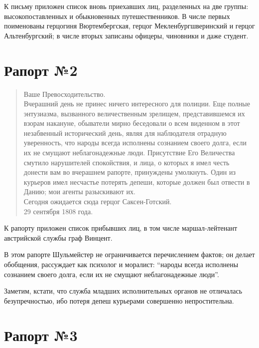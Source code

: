 \documentclass[
  oneside,
  12pt,
  titlepage]{book}
\begin{document}
К письму приложен список вновь приехавших лиц, разделенных на две группы: высокопоставленных и обыкновенных путешественников. В числе первых поименованы герцогиня Вюртембергская, герцог Мекленбургшверинский и герцог Альтенбургский; в числе вторых записаны офицеры, чиновники и даже студент.

\hypertarget{ux440ux430ux43fux43eux440ux442-2}{%
\section{Рапорт №2}\label{ux440ux430ux43fux43eux440ux442-2}}

\begin{quote}
Ваше Превосходительство.\\
Вчерашний день не принес ничего интересного для полиции. Еще полные энтузиазма, вызванного величественным зрелищем, представившемся их взорам накануне, обыватели мирно беседовали о всем виденном в этот незабвенный исторический день, являя для наблюдателя отрадную уверенность, что народы всегда исполнены сознанием своего долга, если их не смущают неблагонадежные люди. Присутствие Его Величества смутило нарушителей спокойствия, и лица, о которых я имел честь донести вам во вчерашнем рапорте, принуждены умолкнуть. Один из курьеров имел несчастье потерять депеши, которые должен был отвести в Данию; мои агенты разыскивают их.\\
Сегодня ожидается сюда герцог Саксен-Готский.\\
29 сентября 1808 года.
\end{quote}

К рапорту приложен список прибывших лиц, в том числе маршал-лейтенант австрийской службы граф Винцент.

В этом рапорте Шульмейстер не ограничивается перечислением фактов; он делает обобщения, рассуждает как психолог и моралист: ``народы всегда исполнены сознанием своего долга, если их не смущают неблагонадежные люди''.

Заметим, кстати, что служба младших исполнительных органов не отличалась безупречностью, ибо потеря депеш курьерами совершенно непростительна.

\hypertarget{ux440ux430ux43fux43eux440ux442-3}{%
\section{Рапорт №3}\label{ux440ux430ux43fux43eux440ux442-3}}
\end{document}
